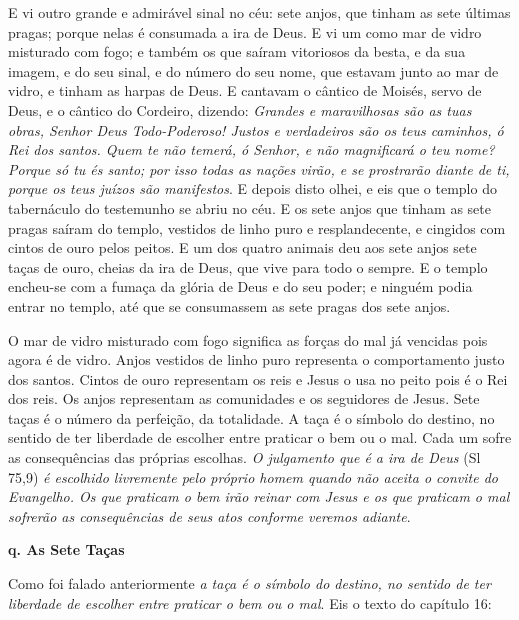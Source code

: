 \documentclass[
]{book}
\begin{document}
E vi outro grande e admirável sinal no céu: sete anjos, que tinham as sete últimas pragas; porque nelas é consumada a ira de Deus. E vi um como mar de vidro misturado com fogo; e também os que saíram vitoriosos da besta, e da sua imagem, e do seu sinal, e do número do seu nome, que estavam junto ao mar de vidro, e tinham as harpas de Deus. E cantavam o cântico de Moisés, servo de Deus, e o cântico do Cordeiro, dizendo: \emph{Grandes e maravilhosas são as tuas obras, Senhor Deus Todo-Poderoso! Justos e verdadeiros são os teus caminhos, ó Rei dos santos. Quem te não temerá, ó Senhor, e não magnificará o teu nome? Porque só tu és santo; por isso todas as nações virão, e se prostrarão diante de ti, porque os teus juízos são manifestos}. E depois disto olhei, e eis que o templo do tabernáculo do testemunho se abriu no céu. E os sete anjos que tinham as sete pragas saíram do templo, vestidos de linho puro e resplandecente, e cingidos com cintos de ouro pelos peitos. E um dos quatro animais deu aos sete anjos sete taças de ouro, cheias da ira de Deus, que vive para todo o sempre. E o templo encheu-se com a fumaça da glória de Deus e do seu poder; e ninguém podia entrar no templo, até que se consumassem as sete pragas dos sete anjos.

O mar de vidro misturado com fogo significa as forças do mal já vencidas pois agora é de vidro. Anjos vestidos de linho puro representa o comportamento justo dos santos. Cintos de ouro representam os reis e Jesus o usa no peito pois é o Rei dos reis. Os anjos representam as comunidades e os seguidores de Jesus. Sete taças é o número da perfeição, da totalidade. A taça é o símbolo do destino, no sentido de ter liberdade de escolher entre praticar o bem ou o mal. Cada um sofre as consequências das próprias escolhas. \emph{O julgamento que é a ira de Deus} (Sl 75,9) \emph{é escolhido livremente pelo próprio homem quando não aceita o convite do Evangelho. Os que praticam o bem irão reinar com Jesus e os que praticam o mal sofrerão as consequências de seus atos conforme veremos adiante}.

\textbf{q. As Sete Taças}

Como foi falado anteriormente \emph{a taça é o símbolo do destino, no sentido de ter liberdade de escolher entre praticar o bem ou o mal}. Eis o texto do capítulo 16:
\end{document}
